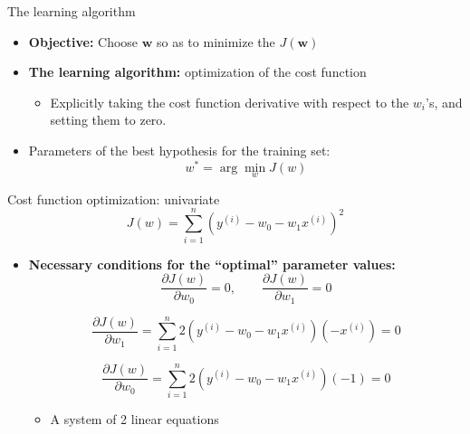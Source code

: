 \documentclass[serif, aspectratio=169]{beamer}
\begin{document}
\begin{frame}{The learning algorithm}

    \begin{itemize}
        \item \textbf{Objective:} Choose \( \mathbf{w} \) so as to minimize the \( J(\mathbf{w}) \)

        \item \textbf{The learning algorithm:} optimization of the cost function
        \begin{itemize}
            \item Explicitly taking the cost function derivative with respect to the \( w_i \)'s, and setting them to zero.
        \end{itemize}

        \item Parameters of the best hypothesis for the training set:
        \[
        w^* = \arg \min_{w} J(w)
        \]
    \end{itemize}


\end{frame}




\begin{frame}{Cost function optimization: univariate}
    \[
    J(w) = \sum_{i=1}^{n} \left( y^{(i)} - w_0 - w_1 x^{(i)} \right)^2
    \]

    \begin{itemize}
        \item \textbf{Necessary conditions for the “optimal” parameter values:}
        \[
        \frac{\partial J(w)}{\partial w_0} = 0, \qquad
        \frac{\partial J(w)}{\partial w_1} = 0
        \]

    \[
    \frac{\partial J(w)}{\partial w_1} = \sum_{i=1}^{n} 2 \left( y^{(i)} - w_0 - w_1 x^{(i)} \right) (-x^{(i)}) = 0
    \]

    \[
    \frac{\partial J(w)}{\partial w_0} = \sum_{i=1}^{n} 2 \left( y^{(i)} - w_0 - w_1 x^{(i)} \right) (-1) = 0
    \]

    \begin{itemize}
        \item A system of 2 linear equations
    \end{itemize}
    \end{itemize}


\end{frame}
\end{document}
